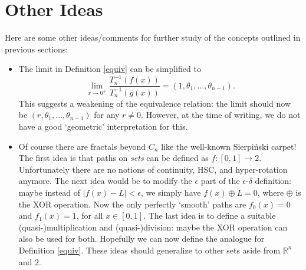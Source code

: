 \documentclass{article}
\theoremstyle{plain}
\begin{document}
\section{Other Ideas}
Here are some other ideas/comments for further study of the concepts outlined in previous sections:
\begin{itemize}
	\item The limit in Definition \ref{equiv} can be simplified to $$\lim_{x \rightarrow 0^+}\frac{T_n^{-1}(f(x))}{T_n^{-1}(g(x))} = (1, \theta_1, \ldots, \theta_{n-1}).$$ This suggests a weakening of the equivalence relation: the limit should now be $(r, \theta_1, \ldots, \theta_{n-1})$ for any $r \ne 0$. However, at the time of writing, we do not have a good `geometric' interpretation for this.
	\item Of course there are fractals beyond $C_n$ like the well-known Sierpiński carpet! The first idea is that paths on \textit{sets} can be defined as $f:[0,1] \rightarrow 2$. Unfortunately there are no notions of continuity, HSC, and hyper-rotation anymore. The next idea would be to modify the $\epsilon$ part of the $\epsilon$-$\delta$ definition: maybe instead of $|f(x)-L|<\epsilon$, we simply have $f(x) \oplus L = 0$, where $\oplus$ is the XOR operation. Now the only perfectly `smooth' paths are $f_0(x)=0$ and $f_1(x)=1$, for all $x\in[0,1]$. The last idea is to define a suitable (quasi-)multiplication and (quasi-)division: maybe the XOR operation can also be used for both. Hopefully we can now define the analogue for Definition \ref{equiv}. These ideas should generalize to other sets aside from $\mathbb{R}^n$ and $2$.
\end{itemize}



\end{document}
